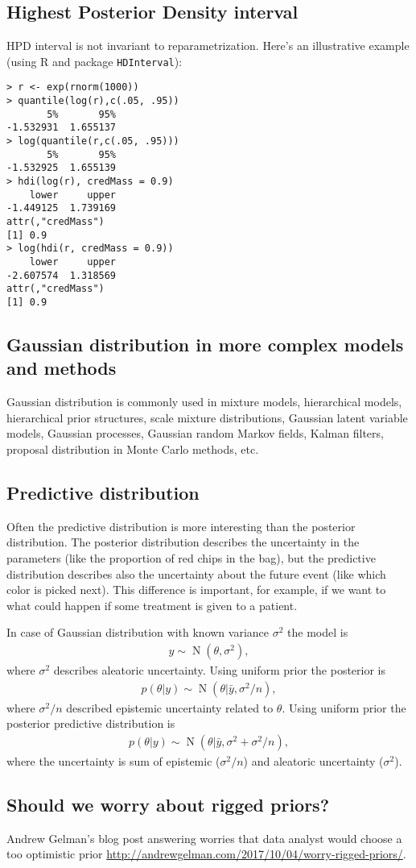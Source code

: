 \documentclass[a4paper,11pt,english]{article}
\DeclareMathOperator{\N}{N}
\begin{document}
\subsection*{Highest Posterior Density interval}

HPD interval is not invariant to reparametrization. Here's an illustrative
example (using R and package {\tt HDInterval}):
 {\small
\begin{verbatim}
> r <- exp(rnorm(1000))
> quantile(log(r),c(.05, .95))
       5%       95% 
-1.532931  1.655137 
> log(quantile(r,c(.05, .95)))
       5%       95% 
-1.532925  1.655139 
> hdi(log(r), credMass = 0.9)
    lower     upper 
-1.449125  1.739169 
attr(,"credMass")
[1] 0.9
> log(hdi(r, credMass = 0.9))
    lower     upper 
-2.607574  1.318569 
attr(,"credMass")
[1] 0.9
\end{verbatim}
}

\subsection*{Gaussian distribution in more complex models and methods}

Gaussian distribution is commonly used in mixture models, hierarchical
models, hierarchical prior structures, scale mixture distributions,
Gaussian latent variable models, Gaussian processes, Gaussian random
Markov fields, Kalman filters, proposal distribution in Monte Carlo
methods, etc.

\subsection*{Predictive distribution}

Often the predictive distribution is more interesting than the
posterior distribution. The posterior distribution describes the
uncertainty in the parameters (like the proportion of red chips in the
bag), but the predictive distribution describes also the uncertainty
about the future event (like which color is picked next). This
difference is important, for example, if we want to what could happen
if some treatment is given to a patient.

In case of Gaussian distribution with known variance $\sigma^2$ the model is
\begin{align*}
  y\sim \N(\theta,\sigma^2),
\end{align*}
where $\sigma^2$ describes aleatoric uncertainty.
Using uniform prior the posterior is 
\begin{align*}
  p(\theta|y) \sim \N(\theta|\bar{y},\sigma^2/n),
\end{align*}
where $\sigma^2/n$ described epistemic uncertainty related to $\theta$.
Using uniform prior the posterior predictive distribution is 
\begin{align*}
  p(\theta|y) \sim \N(\theta|\bar{y},\sigma^2+\sigma^2/n),
\end{align*}
where the uncertainty is sum of epistemic ($\sigma^2/n$) and aleatoric
uncertainty ($\sigma^2$).

\subsection*{Should we worry about rigged priors?}

Andrew Gelman's blog post answering worries that data analyst would
choose a too optimistic prior
\url{http://andrewgelman.com/2017/10/04/worry-rigged-priors/}.
\end{document}
